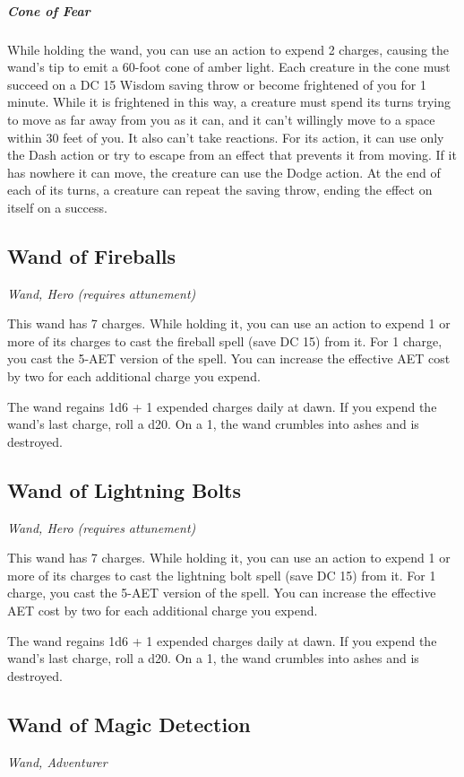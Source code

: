 \subparagraph*{Cone of Fear} While holding the wand, you can use an action to expend 2 charges, causing the wand's tip to emit a 60-foot cone of amber light. Each creature in the cone must succeed on a DC 15 Wisdom saving throw or become frightened of you for 1 minute. While it is frightened in this way, a creature must spend its turns trying to move as far away from you as it can, and it can't willingly move to a space within 30 feet of you. It also can't take reactions. For its action, it can use only the Dash action or try to escape from an effect that prevents it from moving. If it has nowhere it can move, the creature can use the Dodge action. At the end of each of its turns, a creature can repeat the saving throw, ending the effect on itself on a success.

\subsection{Wand of Fireballs}
\textit{Wand, Hero (requires attunement)}

This wand has 7 charges. While holding it, you can use an action to expend 1 or more of its charges to cast the fireball spell (save DC 15) from it. For 1 charge, you cast the 5-AET version of the spell. You can increase the effective AET cost by two for each additional charge you expend.

The wand regains 1d6 + 1 expended charges daily at dawn. If you expend the wand's last charge, roll a d20. On a 1, the wand crumbles into ashes and is destroyed.

\subsection{Wand of Lightning Bolts}
\textit{Wand, Hero (requires attunement)}

This wand has 7 charges. While holding it, you can use an action to expend 1 or more of its charges to cast the lightning bolt spell (save DC 15) from it. For 1 charge, you cast the 5-AET version of the spell. You can increase the effective AET cost by two for each additional charge you expend.

The wand regains 1d6 + 1 expended charges daily at dawn. If you expend the wand's last charge, roll a d20. On a 1, the wand crumbles into ashes and is destroyed.

\subsection{Wand of Magic Detection}
\textit{Wand, Adventurer}

